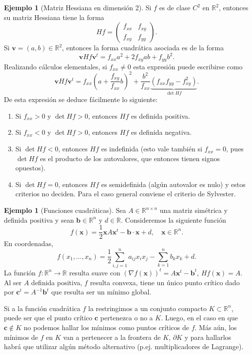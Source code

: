 \documentclass[12pt, a4paper]{amsbook}
\newcommand{\R}{{\mathbb R}}
\newcommand{\vv}{{\mathbf v}}
\newcommand{\xx}{{\mathbf x}}
\newcommand{\bb}{{\mathbf b}}
\newcommand{\cc}{{\mathbf c}}
\theoremstyle{remark}
\theoremstyle{definition}
\newtheorem{ejem}[teo]{Ejemplo}
\numberwithin{section}{chapter}
\numberwithin{subsection}{section}
\numberwithin{equation}{section}
\numberwithin{figure}{chapter}
\begin{document}
\begin{ejem}[Matriz Hessiana en dimensión 2]
Si $f$ es de clase $C^2$ en $\R^2$, entonces su matriz Hessiana tiene la forma
$$
Hf = \begin{pmatrix} f_{xx} & f_{xy}\\f_{xy} & f_{yy}\end{pmatrix}.
$$
Si $\vv = (a, b)\in \R^2$, entonces la forma cuadrática asociada es de la forma
$$
\vv Hf \vv^t = f_{xx} a^2 + 2f_{xy} ab + f_{yy} b^2.
$$
Realizando cálculos elementales, si $f_{xx}\neq0$ esta expresión puede escribirse como
$$
\vv Hf \vv^t = f_{xx} \left( a+ \frac{f_{xy}}{f_{xx}} b\right)^2 + \frac{b^2}{f_{xx}}\underbrace{(f_{xx}f_{yy}-f_{xy}^2)}_{\det Hf}.
$$
De esta expresión se deduce fácilmente lo siguiente:
\begin{enumerate}
\item Si $f_{xx}>0$ y $\det Hf >0$, entonces $Hf$ es definida positiva.
\item Si $f_{xx}<0$ y $\det Hf>0$, entonces $Hf$ es definida negativa.
\item Si $\det Hf<0$, entonces $Hf$ es indefinida (esto vale también si $f_{xx}=0$, pues $\det Hf$ es el producto de los autovalores, que entonces tienen signos opuestos).
\item Si $\det Hf=0$, entonces $Hf$ es semidefinida (algún autovalor es nulo) y estos criterios no deciden. Para el caso general conviene el criterio de Sylvester.
\end{enumerate}
\end{ejem}

\begin{ejem}[Funciones cuadráticas]
Sea $A\in \R^{n\times n}$ una matriz simétrica y definida positiva y sean $\bb \in \R^n$ y $d\in \R$. Consideremos la siguiente función
$$
f(\xx) = \frac12 \xx A\xx^t - \bb\cdot\xx + d,\quad \xx\in\R^n.
$$
En coordenadas, 
$$
f(x_1,\dots,x_n) = \frac12\sum_{i, j=1}^n a_{ij} x_i x_j - \sum_{k=1}^n b_k x_k + d.
$$
La función $f\colon \R^n\to\R$ resulta suave con $(\nabla f(\xx))^t = A\xx^t - \bb^t$, $Hf(\xx) = A$. Al ser $A$ definida positiva, $f$ resulta convexa, tiene un único punto crítico dado por $\cc^t= A^{-1}\bb^t$ que resulta ser un mínimo global.

Si a la función cuadrática $f$ la restringimos a un conjunto compacto $K\subset \R^n$, puede ser que el punto crítico $\cc$ pertenezca o no a $K$. Luego, en el caso en que $\cc\not\in K$ no podemos hallar los mínimos como puntos críticos de $f$. Más aún, los mínimos de $f$ en $K$ van a pertenecer a la frontera de $K$, $\partial K$ y para hallarlos habrá que utilizar algún método alternativo (p.ej. multiplicadores de Lagrange).
\end{ejem}
\end{document}
